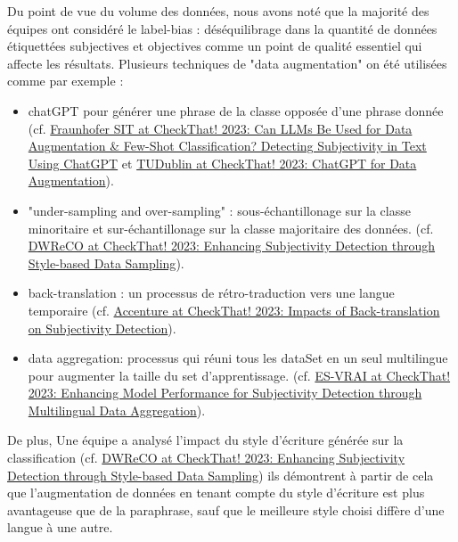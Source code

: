 \documentclass[11pt]{rapport_class}
\begin{document}
\qquad Du point de vue du volume des données, nous avons noté que la majorité des équipes ont considéré le label-bias : déséquilibrage dans la quantité de données étiquettées subjectives et objectives comme un point de qualité essentiel qui affecte les résultats. Plusieurs techniques de "data augmentation" on été utilisées comme par exemple :
\begin{itemize}

    \item chatGPT pour générer une phrase de la classe opposée d'une phrase donnée (cf. \href{https://ceur-ws.org/Vol-3497/paper-028.pdf}{Fraunhofer SIT at CheckThat! 2023: Can LLMs Be Used for Data Augmentation \& Few-Shot Classification? Detecting Subjectivity in Text Using ChatGPT}
    et \href{https://ceur-ws.org/Vol-3497/paper-041.pdf}{TUDublin at CheckThat! 2023: ChatGPT for Data
Augmentation}).
    
    \item "under-sampling and over-sampling" : sous-échantillonage sur la classe minoritaire et sur-échantillonage sur la classe majoritaire des données. (cf. \href{https://ceur-ws.org/Vol-3497/paper-026.pdf}{DWReCO at CheckThat! 2023: Enhancing Subjectivity Detection through Style-based Data Sampling}).
   
    \item back-translation : un processus de rétro-traduction vers une langue temporaire (cf. \href{https://ceur-ws.org/Vol-3497/paper-045.pdf}{Accenture at CheckThat! 2023: Impacts of Back-translation on Subjectivity Detection}).

    \item data aggregation: processus qui réuni tous les dataSet en un seul multilingue pour augmenter la taille du set d'apprentissage. (cf. \href{https://ceur-ws.org/Vol-3497/paper-037.pdf}{ES-VRAI at CheckThat! 2023: Enhancing Model Performance for Subjectivity Detection through Multilingual Data Aggregation}).
\end{itemize}
 De plus, Une équipe a analysé l'impact du style d'écriture générée sur la classification (cf. \href{https://ceur-ws.org/Vol-3497/paper-026.pdf}{DWReCO at CheckThat! 2023: Enhancing Subjectivity Detection through Style-based Data Sampling}) ils démontrent à partir de cela que l'augmentation de données en tenant compte du style d'écriture est plus avantageuse que de la paraphrase, sauf que le meilleure style choisi diffère d'une langue à une autre.  
 
\end{document}
